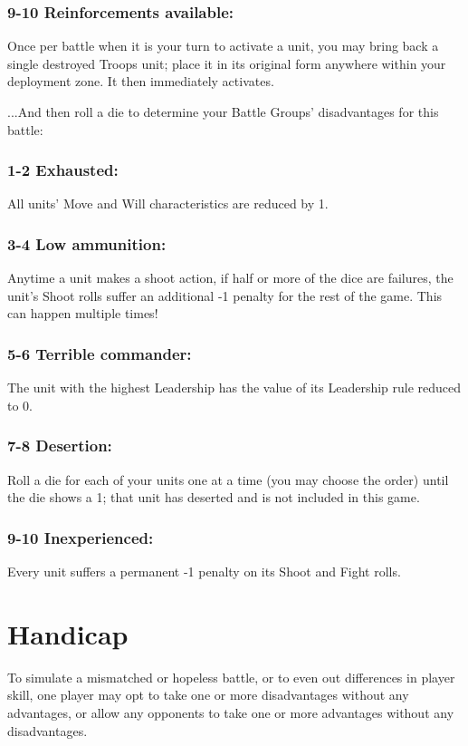 \begin{multicols}{2}
\subsubsection*{9-10 Reinforcements available:} Once per battle when it is your turn to activate a unit, you may bring back a single destroyed Troops unit; place it in its original form anywhere within your deployment zone. It then immediately activates.

\vspace{2em}

...And then roll a die to determine your Battle Groups' disadvantages for this battle:

\subsubsection*{1-2 Exhausted:} All units' Move and Will characteristics are reduced by 1.

\subsubsection*{3-4 Low ammunition:} Anytime a unit makes a shoot action, if half or more of the dice are failures, the unit's Shoot rolls suffer an additional -1 penalty for the rest of the game. This can happen multiple times!

\subsubsection*{5-6 Terrible commander:} The unit with the highest Leadership has the value of its Leadership rule reduced to 0.

\subsubsection*{7-8 Desertion:} Roll a die for each of your units one at a time (you may choose the order) until the die shows a 1; that unit has deserted and is not included in this game.

\subsubsection*{9-10 Inexperienced:} Every unit suffers a permanent -1 penalty on its Shoot and Fight rolls.




\section*{Handicap}
To simulate a mismatched or hopeless battle, or to even out differences in player skill, one player may opt to take one or more disadvantages without any advantages,  or allow any opponents to take one or more advantages without any disadvantages.

\end{multicols}

